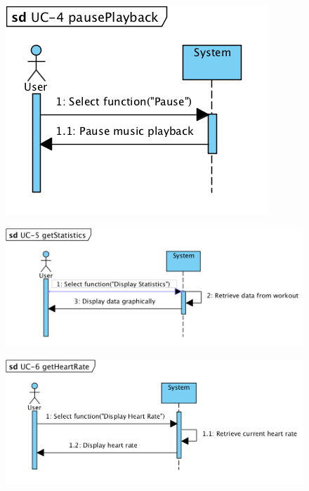 \documentclass[letterpaper,english, 12pt]{scrreprt}
\begin{document}
\begin{figure}[H]
        \centering
        \includegraphics[width=\textwidth]{img/ssd/ssd_uc4.png}\\
\end{figure}

\begin{figure}[H]
        \centering
        \includegraphics[width=\textwidth]{img/ssd/ssd_uc5.png}\\
\end{figure}
\begin{figure}[H]
	    \centering
        \includegraphics[width=\textwidth]{img/ssd/ssd_uc6.png}\\
\end{figure}
\end{document}
